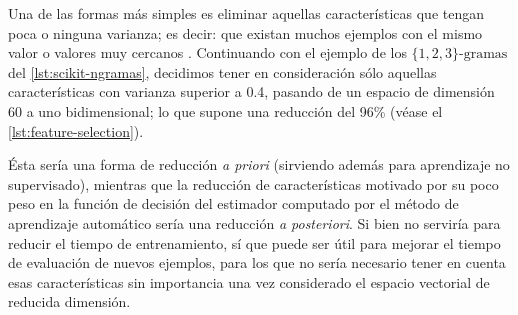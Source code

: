 Una de las formas más simples es eliminar aquellas características que tengan poca o ninguna varianza; es decir: que existan muchos ejemplos con el mismo valor o valores muy cercanos \citep{Pedregosa2011}. Continuando con el ejemplo de los $\{1,2,3\}\text{-gramas}$ del \autoref{lst:scikit-ngramas}, decidimos tener en consideración sólo aquellas características con varianza superior a 0.4, pasando de un espacio de dimensión 60 a uno bidimensional; lo que supone una reducción del 96\% (véase el \autoref{lst:feature-selection}).

Ésta sería una forma de reducción \emph{a priori} (sirviendo además para aprendizaje no supervisado), mientras que la reducción de características motivado por su poco peso en la función de decisión del estimador computado por el método de aprendizaje automático sería una reducción \emph{a posteriori}. Si bien no serviría para reducir el tiempo de entrenamiento, sí que puede ser útil para mejorar el tiempo de evaluación de nuevos ejemplos, para los que no sería necesario tener en cuenta esas características sin importancia una vez considerado el espacio vectorial de reducida dimensión.

